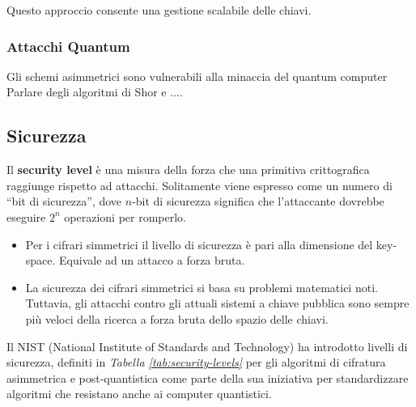 \noindent
Questo approccio consente una gestione scalabile delle chiavi.

\subsubsection*{Attacchi Quantum}

Gli schemi asimmetrici sono vulnerabili alla minaccia del quantum computer
Parlare degli algoritmi di Shor e ....



\subsection{Sicurezza}

Il \textbf{security level} è una misura della forza che una primitiva crittografica raggiunge rispetto ad attacchi.
Solitamente viene espresso come un numero di “bit di sicurezza”, dove $n$-bit di sicurezza significa che l'attaccante dovrebbe eseguire $2^n$ operazioni per romperlo.
\begin{itemize}
    \item Per i cifrari simmetrici il livello di sicurezza è pari alla dimensione del key-space. Equivale ad un attacco a forza bruta.
    \item La sicurezza dei cifrari simmetrici si basa su problemi matematici noti. Tuttavia, gli attacchi contro gli attuali sistemi a chiave pubblica sono sempre più veloci della ricerca a forza bruta dello spazio delle chiavi.
\end{itemize}

\noindent
Il NIST (National Institute of Standards and Technology) ha introdotto livelli di sicurezza, definiti in \textit{Tabella \ref{tab:security-levels}} per gli algoritmi di cifratura asimmetrica e post-quantistica come parte della sua iniziativa per standardizzare algoritmi che resistano anche ai computer quantistici.


